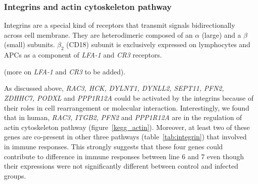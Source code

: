 \documentclass[10pt]{article}
\begin{document}
\subsubsection*{Integrins and actin cytoskeleton pathway}

Integrins are a special kind of receptors that transmit signals bidirectionally across cell membrane.
They are heterodimeric composed of an $\alpha$ (large) and a $\beta$ (small) subunits.
$\beta_{2}$ (CD18) subunit is exclusively expressed on lymphocytes and APCs as a component of \textit{LFA-1}
and \textit{CR3} receptors.

(more on \textit{LFA-1} and \textit{CR3} to be added).

As discussed above, \textit{RAC3, HCK, DYLNT1, DYNLL2, SEPT11, PFN2, ZDHHC7, PODXL} and \textit{PPP1R12A}
could be activated by the integrins because of their roles in cell rearrangement or molecular interaction.
Interestingly, we found that in human, \textit{RAC3, ITGB2, PFN2} and \textit{PPP1R12A} are in the regulation
of actin cytoskeleton pathway (figure~\ref{kegg_actin}).
Moreover, at least two of these genes are co-present in other three pathways (table~\ref{tab:integrin}) that
involved in immune responses.
This strongly suggests that these four genes could contribute to difference in immune responses between
line 6 and 7 even though their expressions were not significantly different between control and infected groups.

% 
% 
\end{document}
